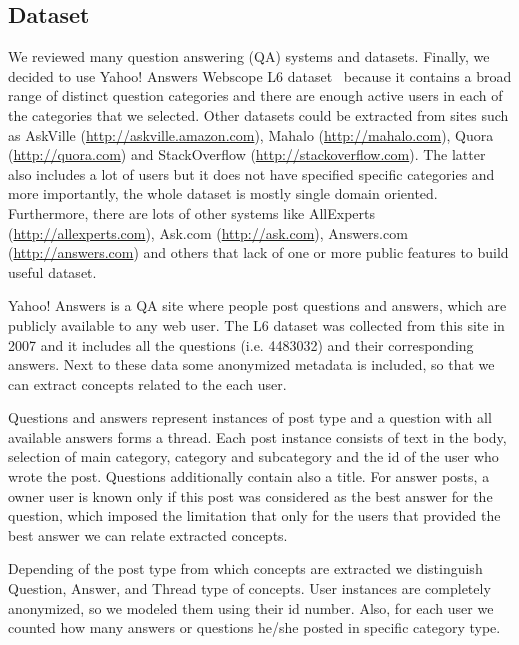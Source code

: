 \documentclass[conference]{IEEEtran}
\begin{document}
\vspace{-0.3cm}
\subsection{Dataset}
\label{sec:dataset}
We reviewed many question answering (QA) systems and datasets. Finally, we decided to use Yahoo! Answers Webscope L6 dataset~\cite{bib:yahool6} because it contains a broad range of distinct question categories and there are enough active users in each of the categories that we selected. Other datasets could be extracted from sites such as AskVille (\url{http://askville.amazon.com}), Mahalo (\url{http://mahalo.com}), Quora (\url{http://quora.com}) and StackOverflow (\url{http://stackoverflow.com}). The latter also includes a lot of users but it does not have specified specific categories and more importantly, the whole dataset is mostly single domain oriented. Furthermore, there are lots of other systems like AllExperts (\url{http://allexperts.com}), Ask.com (\url{http://ask.com}), Answers.com (\url{http://answers.com}) and others that lack of one or more public features to build useful dataset.

Yahoo! Answers is a QA site where people post questions and answers, which are publicly available to any web user. The L6 dataset was collected from this site in 2007 and it includes all the questions (i.e. 4483032) and their corresponding answers. Next to these data some anonymized metadata is included, so that we can extract concepts related to the each user.

Questions and answers represent instances of post type and a question with all available answers forms a thread. Each post instance consists of text in the body, selection of main category, category and subcategory and the id of the user who wrote the post. Questions additionally contain also a title. For answer posts, a owner user is known only if this post was considered as the best answer for the question, which imposed the limitation that only for the users that provided the best answer we can relate extracted concepts.

Depending of the post type from which concepts are extracted we distinguish Question, Answer, and Thread type of concepts. User instances are completely anonymized, so we modeled them using their id number. Also, for each user we counted how many answers or questions he/she posted in specific category type.
\end{document}
